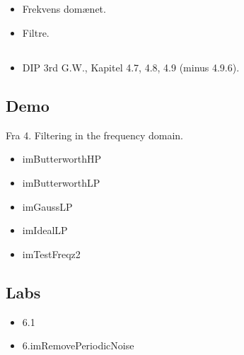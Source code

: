 \subsection{\subtopics}

\begin{itemize}
	\item Frekvens domænet.
	\item Filtre.
\end{itemize}

\subsection{\curriculum}

\begin{itemize}
	\item DIP 3rd G.W., Kapitel 4.7, 4.8, 4.9 (minus 4.9.6).
\end{itemize}

\subsection{Demo}

Fra 4. Filtering in the frequency domain.

\begin{itemize}
	\item imButterworthHP
	\item imButterworthLP
	\item imGaussLP
	\item imIdealLP
	\item imTestFreqz2
\end{itemize}

\subsection{Labs}

\begin{itemize}
	\item 6.1
	\item 6.imRemovePeriodicNoise
\end{itemize}
